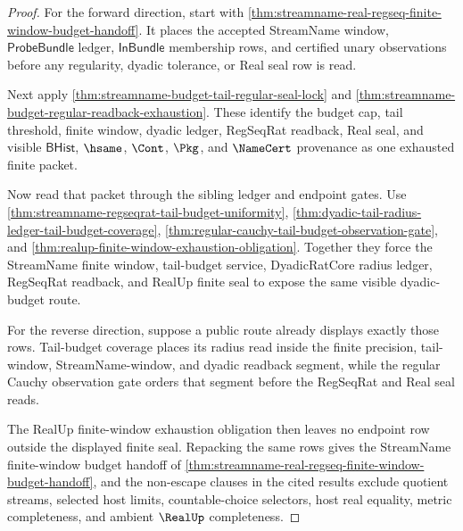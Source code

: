 \begin{proof}
For the forward direction, start with
\autoref{thm:streamname-real-regseq-finite-window-budget-handoff}. It places the
accepted StreamName window, $\mathsf{ProbeBundle}$ ledger,
$\mathsf{InBundle}$ membership rows, and certified unary observations before any
regularity, dyadic tolerance, or Real seal row is read.

Next apply \autoref{thm:streamname-budget-tail-regular-seal-lock} and
\autoref{thm:streamname-budget-regular-readback-exhaustion}. These identify the
budget cap, tail threshold, finite window, dyadic ledger, RegSeqRat readback,
Real seal, and visible $\mathsf{BHist}$, $\hsame$, $\Cont$, $\Pkg$, and
$\NameCert$ provenance as one exhausted finite packet.

Now read that packet through the sibling ledger and endpoint gates. Use
\autoref{thm:streamname-regseqrat-tail-budget-uniformity},
\autoref{thm:dyadic-tail-radius-ledger-tail-budget-coverage},
\autoref{thm:regular-cauchy-tail-budget-observation-gate}, and
\autoref{thm:realup-finite-window-exhaustion-obligation}. Together they force the
StreamName finite window, tail-budget service, DyadicRatCore radius ledger,
RegSeqRat readback, and RealUp finite seal to expose the same visible
dyadic-budget route.

For the reverse direction, suppose a public route already displays exactly those
rows. Tail-budget coverage places its radius read inside the finite precision,
tail-window, StreamName-window, and dyadic readback segment, while the regular
Cauchy observation gate orders that segment before the RegSeqRat and Real seal
reads.

The RealUp finite-window exhaustion obligation then leaves no endpoint row
outside the displayed finite seal. Repacking the same rows gives the StreamName
finite-window budget handoff of
\autoref{thm:streamname-real-regseq-finite-window-budget-handoff}, and the
non-escape clauses in the cited results exclude quotient streams, selected host
limits, countable-choice selectors, host real equality, metric completeness, and
ambient $\RealUp$ completeness.
\end{proof}

